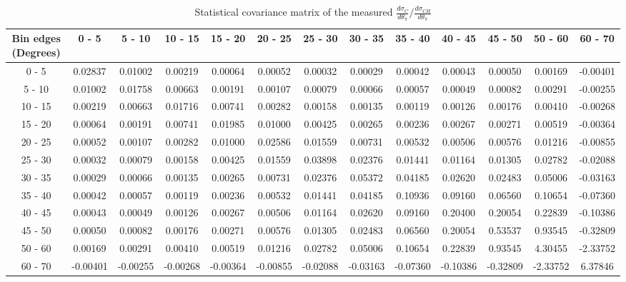 \documentclass[aps,prl,twocolumn,superscriptaddress,nofootinbib]{revtex4-1}
\begin{document}
\begin{turnpage}
 \begin{table}[h!]
  \centering
  \caption{Statistical covariance matrix of the measured $\frac{d\sigma_{C}}{d\theta_{\pi}}/\frac{d\sigma_{CH}}{d\theta_{\pi}}$}
    \begin{tabular}{c||cccccccccccc}
      Bin edges (Degrees) & 0 - 5 & 5 - 10 & 10 - 15 & 15 - 20 & 20 - 25 & 25 - 30 & 30 - 35 & 35 - 40 & 40 - 45 & 45 - 50 & 50 - 60 & 60 - 70 \\
\hline \hline
        0 - 5 &  0.02837 &  0.01002 &  0.00219 &  0.00064 &  0.00052 &  0.00032 &  0.00029 &  0.00042 &  0.00043 &  0.00050 &  0.00169 & -0.00401 \\
       5 - 10 &  0.01002 &  0.01758 &  0.00663 &  0.00191 &  0.00107 &  0.00079 &  0.00066 &  0.00057 &  0.00049 &  0.00082 &  0.00291 & -0.00255 \\
      10 - 15 &  0.00219 &  0.00663 &  0.01716 &  0.00741 &  0.00282 &  0.00158 &  0.00135 &  0.00119 &  0.00126 &  0.00176 &  0.00410 & -0.00268 \\
      15 - 20 &  0.00064 &  0.00191 &  0.00741 &  0.01985 &  0.01000 &  0.00425 &  0.00265 &  0.00236 &  0.00267 &  0.00271 &  0.00519 & -0.00364 \\
      20 - 25 &  0.00052 &  0.00107 &  0.00282 &  0.01000 &  0.02586 &  0.01559 &  0.00731 &  0.00532 &  0.00506 &  0.00576 &  0.01216 & -0.00855 \\
      25 - 30 &  0.00032 &  0.00079 &  0.00158 &  0.00425 &  0.01559 &  0.03898 &  0.02376 &  0.01441 &  0.01164 &  0.01305 &  0.02782 & -0.02088 \\
      30 - 35 &  0.00029 &  0.00066 &  0.00135 &  0.00265 &  0.00731 &  0.02376 &  0.05372 &  0.04185 &  0.02620 &  0.02483 &  0.05006 & -0.03163 \\
      35 - 40 &  0.00042 &  0.00057 &  0.00119 &  0.00236 &  0.00532 &  0.01441 &  0.04185 &  0.10936 &  0.09160 &  0.06560 &  0.10654 & -0.07360 \\
      40 - 45 &  0.00043 &  0.00049 &  0.00126 &  0.00267 &  0.00506 &  0.01164 &  0.02620 &  0.09160 &  0.20400 &  0.20054 &  0.22839 & -0.10386 \\
      45 - 50 &  0.00050 &  0.00082 &  0.00176 &  0.00271 &  0.00576 &  0.01305 &  0.02483 &  0.06560 &  0.20054 &  0.53537 &  0.93545 & -0.32809 \\
      50 - 60 &  0.00169 &  0.00291 &  0.00410 &  0.00519 &  0.01216 &  0.02782 &  0.05006 &  0.10654 &  0.22839 &  0.93545 &  4.30455 & -2.33752 \\
      60 - 70 & -0.00401 & -0.00255 & -0.00268 & -0.00364 & -0.00855 & -0.02088 & -0.03163 & -0.07360 & -0.10386 & -0.32809 & -2.33752 &  6.37846 \\
    \end{tabular}
  \label{tablecov:C_Statistical_ThetaPi}
  \end{table}
\end{turnpage}
\end{document}
